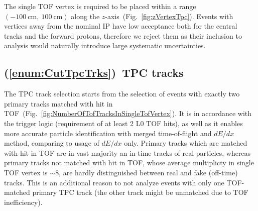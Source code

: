 The single TOF vertex is required to be placed within a range $(-100~\textrm{cm},~100~\textrm{cm})$ along the $z$-axis~(Fig.~\ref{fig:zVertexTpc}). Events with vertices away from the nominal IP have low acceptance both for the central tracks and the forward protons, therefore we reject them as their inclusion to analysis would naturally introduce large systematic uncertainties.

\subsection{(\ref{enum:CutTpcTrks})~TPC tracks}

The TPC track selection starts from the selection of events with exactly two primary tracks matched with hit in TOF~(Fig.~\ref{fig:NumberOfTofTracksInSingleTofVertex}). It is in accordance with the trigger logic (requirement of at least 2 L0 TOF hits), as well as it enables more accurate particle identification with merged time-of-flight and $dE/dx$ method, comparing to usage of $dE/dx$ only. Primary tracks which are matched with hit in TOF are in vast majority an in-time tracks of real particles, whereas primary tracks not matched with hit in TOF, whose average multiplicty in single TOF vertex is $\sim$8, are hardly distinguished between real and fake (off-time) tracks. This is an additional reason to not analyze events with only one TOF-matched primary TPC track (the other track might be unmatched due to TOF inefficiency).

